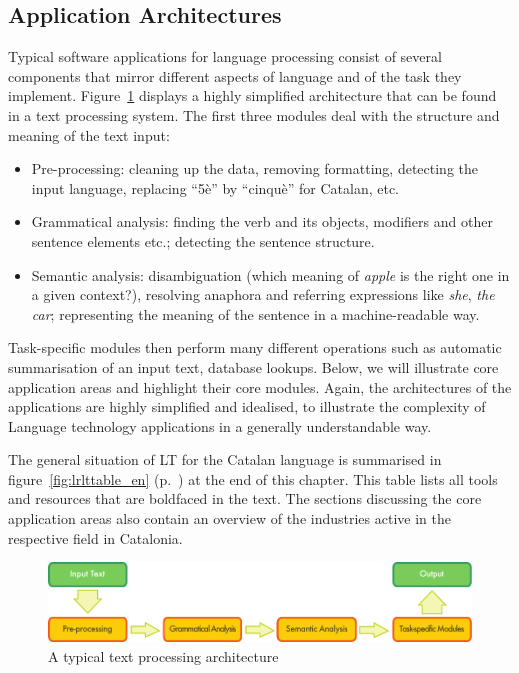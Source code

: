 \begin{multicols}{2}
\subsection{Application Architectures}

Typical software applications for language processing consist of several components that mirror different aspects of language and of the task they implement. Figure~\ref{fig:textprocessingarch_en} displays a highly simplified architecture that can be found in a text processing system. The first three modules deal with the structure and meaning of the text input:

\begin{itemize}
\item Pre-processing: cleaning up the data, removing formatting, detecting the input language, replacing “5è” by “cinquè” for Catalan, etc.
\item Grammatical analysis: finding the verb and its objects, modifiers and other sentence elements etc.; detecting the sentence structure.
\item Semantic analysis: disambiguation (which meaning of \textit{apple} is the right one in a given context?), resolving anaphora and referring expressions like \textit{she}, \textit{the car}; representing the meaning of the sentence in a machine-readable way.
\end{itemize}

Task-specific modules then perform many different operations such as automatic summarisation of an input text, database lookups. Below, we will illustrate core application areas and highlight their core modules. Again, the architectures of the applications are highly simplified and idealised, to illustrate the complexity of Language technology applications in a generally understandable way.

The general situation of LT for the Catalan language is summarised in figure~\ref{fig:lrlttable_en} (p.~\pageref{fig:lrlttable_en}) at the end of this chapter. This table lists all tools and resources that are boldfaced in the text.  The sections discussing the core application areas also contain an overview of the industries active in the respective field in Catalonia.

\begin{figure}[bt]
  \center
  \includegraphics[width=\textwidth]{../_media/english/text_processing_app_architecture}
  \caption{A typical text processing architecture}
  \label{fig:textprocessingarch_en}
\end{figure}


\end{multicols}
